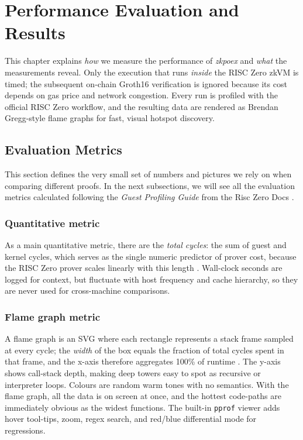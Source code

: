 \chapter{Performance Evaluation and Results}\makeatletter{}\makeatother
\label{chap4}

This chapter explains \textit{how} we measure the performance of \textit{zkpoex} and \textit{what} the measurements reveal. Only the execution that runs \textit{inside} the RISC Zero zkVM is timed; the subsequent on-chain Groth16 verification is ignored because its cost depends on gas price and network congestion. Every run is profiled with the official RISC Zero workflow\cite{risc0_profiling}, and the resulting data are rendered as Brendan Gregg-style flame graphs for fast, visual hotspot discovery\cite{gregg_cpu_flamegraphs}.

\section{Evaluation Metrics}
This section defines the very small set of numbers and pictures we rely on when comparing different proofs. In the next subsections, we will see all the evaluation metrics calculated following the \textit{Guest Profiling Guide} from the Risc Zero Docs \cite{risc0_profiling}. 

\subsection{Quantitative metric}
As a main quantitative metric, there are the \textit{total cycles}: the sum of guest and kernel cycles, which serves as the single numeric predictor of prover cost, because the RISC Zero prover scales linearly with this length \cite{risc0_optimization}.  
Wall-clock seconds are logged for context, but fluctuate with host frequency and
cache hierarchy, so they are never used for cross-machine comparisons.

\subsection{Flame graph metric}
A flame graph is an SVG where each rectangle represents a stack frame sampled at every cycle; the \textit{width} of the box equals the fraction of total cycles spent in that frame, and the x-axis therefore aggregates 100\% of runtime \cite{gregg_cpu_flamegraphs}. The y-axis shows call-stack depth, making deep towers easy to spot as recursive or interpreter loops\cite{gregg_cpu_flamegraphs}. Colours are random warm tones with no semantics. With the flame graph, all the data is on screen at once, and the hottest code-paths are immediately obvious as the widest functions. The built-in \texttt{pprof} viewer adds hover tool-tips, zoom, regex search, and red/blue differential mode for regressions\cite{pprof_flamegraph,gregg_diff_flamegraphs}.

